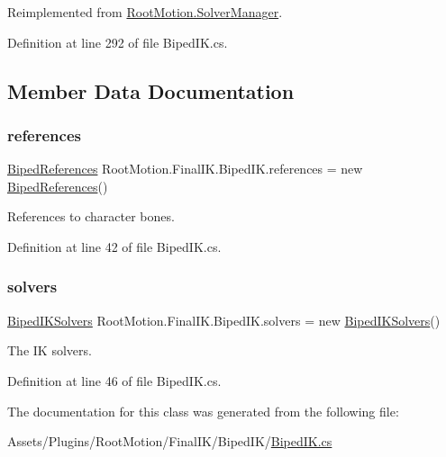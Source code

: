 Reimplemented from \mbox{\hyperlink{class_root_motion_1_1_solver_manager_ac7a8239a700672570da89d88544a340d}{Root\+Motion.\+Solver\+Manager}}.



Definition at line 292 of file Biped\+I\+K.\+cs.



\subsection{Member Data Documentation}
\mbox{\label{class_root_motion_1_1_final_i_k_1_1_biped_i_k_ac93bc8bdce80e6b8cbadf19f86881a69}} 
\subsubsection{\texorpdfstring{references}{references}}
{\footnotesize\ttfamily \mbox{\hyperlink{class_root_motion_1_1_biped_references}{Biped\+References}} Root\+Motion.\+Final\+I\+K.\+Biped\+I\+K.\+references = new \mbox{\hyperlink{class_root_motion_1_1_biped_references}{Biped\+References}}()}



References to character bones. 



Definition at line 42 of file Biped\+I\+K.\+cs.

\mbox{\label{class_root_motion_1_1_final_i_k_1_1_biped_i_k_aaa340fa0be202c7922423736dd274068}} 
\subsubsection{\texorpdfstring{solvers}{solvers}}
{\footnotesize\ttfamily \mbox{\hyperlink{class_root_motion_1_1_final_i_k_1_1_biped_i_k_solvers}{Biped\+I\+K\+Solvers}} Root\+Motion.\+Final\+I\+K.\+Biped\+I\+K.\+solvers = new \mbox{\hyperlink{class_root_motion_1_1_final_i_k_1_1_biped_i_k_solvers}{Biped\+I\+K\+Solvers}}()}



The IK solvers. 



Definition at line 46 of file Biped\+I\+K.\+cs.



The documentation for this class was generated from the following file\+:\begin{DoxyCompactItemize}
\item 
Assets/\+Plugins/\+Root\+Motion/\+Final\+I\+K/\+Biped\+I\+K/\mbox{\hyperlink{_biped_i_k_8cs}{Biped\+I\+K.\+cs}}\end{DoxyCompactItemize}
